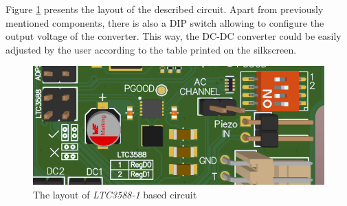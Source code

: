 \documentclass[12pt,a4paper]{article}
\begin{document}
\par

Figure \ref{fig:ltc3588layout} presents the layout of the described circuit. Apart from previously mentioned components, there is also a DIP switch allowing to configure the output voltage of the converter. This way, the DC-DC converter could be easily adjusted by the user according to the table printed on the silkscreen.

\begin{figure}[ht!]
\includegraphics[scale=0.8]{ltc3588_layout.png}
\caption{The layout of \textit{LTC3588-1} based circuit}
\label{fig:ltc3588layout}
\end{figure}
\end{document}
